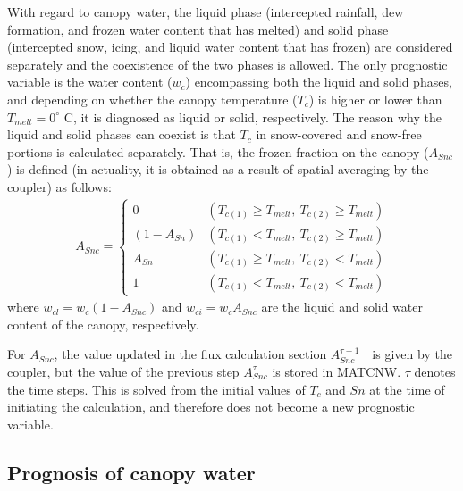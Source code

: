 With regard to canopy water, the liquid phase (intercepted rainfall, dew formation, and frozen water content that has melted) and solid phase (intercepted snow, icing, and liquid water content that
has frozen) are considered separately and the coexistence of the two phases is allowed. The only prognostic variable is the water content (\(w_c\)) encompassing both the liquid and solid phases, and
depending on whether the canopy temperature (\(T_c\)) is higher or lower than \(T_{melt} = 0^{\circ}\) C, it is diagnosed as liquid or solid, respectively. The reason why the liquid and solid phases
can coexist is that \(T_c\) in snow-covered and snow-free portions is calculated separately. That is, the frozen fraction on the canopy (\(A_{Snc}\)) is defined (in actuality, it is obtained as a
result of spatial averaging by the coupler) as follows: \begin{eqnarray}
 A_{Snc} = \left\{
\begin{array}{ll}
 0 & (T_{c(1)} \geq T_{melt}, \ T_{c(2)} \geq T_{melt})\\
 (1-A_{Sn}) & (T_{c(1)} < T_{melt}, \ T_{c(2)} \geq T_{melt})\\
 A_{Sn} & (T_{c(1)} \geq T_{melt}, \ T_{c(2)} < T_{melt})\\
 1 & (T_{c(1)} < T_{melt}, \ T_{c(2)} < T_{melt})
\end{array}
\right.
\end{eqnarray} where \(w_{cl} = w_c ( 1 - A_{Snc})\) and \(w_{ci} = w_c A_{Snc}\) are the liquid and solid water content of the canopy, respectively.

For \(A_{Snc}\), the value updated in the flux calculation section \(A_{Snc}^{\tau+1}\)　is given by the coupler, but the value of the previous step \(A_{Snc}^{\tau}\) is stored in MATCNW. \(\tau\)
denotes the time steps. This is solved from the initial values of \(T_c\) and \(Sn\) at the time of initiating the calculation, and therefore does not become a new prognostic variable.

\hypertarget{prognosis-of-canopy-water}{%
\subsection{Prognosis of canopy water}\label{prognosis-of-canopy-water}}

